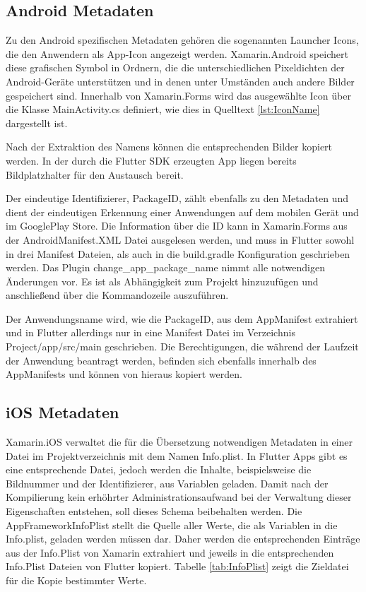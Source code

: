 \subsection{Android Metadaten}
Zu den Android spezifischen Metadaten gehören die sogenannten Launcher Icons, die den Anwendern als App-Icon angezeigt werden. Xamarin.Android speichert diese grafischen Symbol in Ordnern, die die unterschiedlichen Pixeldichten der Android-Geräte unterstützen und in denen unter Umständen auch andere Bilder gespeichert sind.  Innerhalb von Xamarin.Forms wird das ausgewählte Icon über die Klasse MainActivity.cs definiert, wie dies in Quelltext \ref{lst:IconName} dargestellt ist. 



Nach der Extraktion des Namens können die entsprechenden Bilder kopiert werden.  In der durch die Flutter SDK erzeugten App liegen bereits Bildplatzhalter für den Austausch bereit.

Der eindeutige Identifizierer,  PackageID,  zählt ebenfalls zu den Metadaten und dient der eindeutigen Erkennung einer Anwendungen auf dem mobilen Gerät und im GooglePlay Store.  Die Information über die ID kann in Xamarin.Forms aus der AndroidManifest.XML Datei ausgelesen werden, und muss in Flutter sowohl in drei Manifest Dateien,  als auch in die \glq build.gradle\grq{} Konfiguration geschrieben werden.  Das Plugin \glq change\_app\_package\_name\grq{}  nimmt alle notwendigen Änderungen vor.  Es ist als Abhängigkeit zum Projekt hinzuzufügen und anschließend über die Kommandozeile auszuführen. 

Der Anwendungsname wird, wie die PackageID,  aus dem AppManifest extrahiert und in Flutter allerdings nur in eine Manifest Datei im Verzeichnis Project/app/src/main\grq{} geschrieben.  Die Berechtigungen,  die während der Laufzeit der Anwendung beantragt werden,  befinden sich ebenfalls innerhalb des AppManifests und können von hieraus kopiert werden.

\subsection{iOS Metadaten}
Xamarin.iOS verwaltet die für die Übersetzung notwendigen Metadaten in einer Datei im  Projektverzeichnis mit dem Namen Info.plist.  In Flutter Apps gibt es eine entsprechende Datei,  jedoch werden die Inhalte,  beispielsweise die Bildnummer und der Identifizierer,  aus Variablen geladen.  Damit nach der Kompilierung kein erhöhrter Administrationsaufwand bei der Verwaltung dieser Eigenschaften entstehen,  soll dieses Schema beibehalten werden.  Die AppFrameworkInfoPlist stellt die Quelle aller Werte,  die als Variablen in die Info.plist, geladen werden müssen dar.   Daher werden die entsprechenden Einträge aus der Info.Plist von Xamarin extrahiert und jeweils in die entsprechenden Info.Plist Dateien von Flutter kopiert.  Tabelle \ref{tab:InfoPlist} zeigt die Zieldatei für die Kopie bestimmter Werte.


